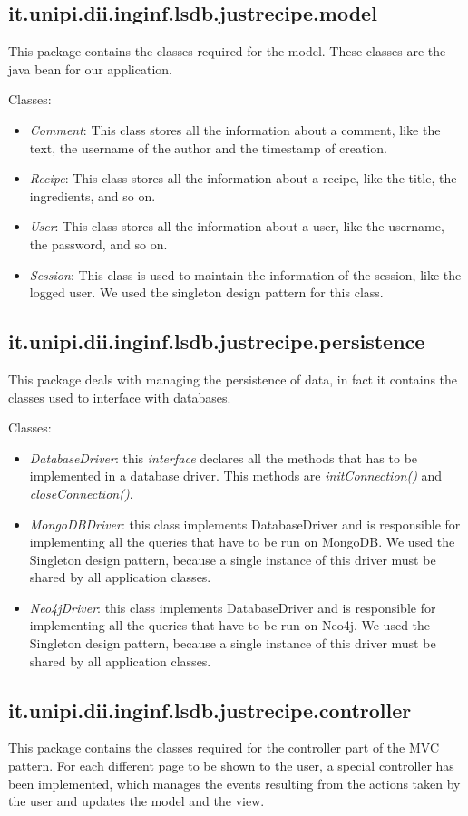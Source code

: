 \documentclass[a4paper]{report}
\begin{document}
\subsection{it.unipi.dii.inginf.lsdb.justrecipe.model}
This package contains the classes required for the model. These classes are the java bean for our application.

\noindent Classes:
  \begin{itemize}
	\item \emph{Comment}: This class stores all the information about a comment, like the text, the username of the author and the timestamp of creation. 
	\item \emph{Recipe}: This class stores all the information about a recipe, like the title, the ingredients, and so on.
	\item \emph{User}: This class stores all the information about a user, like the username, the password, and so on.
	\item \emph{Session}: This class is used to maintain the information of the session, like the logged user. We used the singleton design pattern for this class.
\end{itemize}
\subsection {it.unipi.dii.inginf.lsdb.justrecipe.persistence}
This package deals with managing the persistence of data, in fact it contains the classes used to interface with databases.

\noindent Classes:
 \begin{itemize}
	\item \emph{DatabaseDriver}: this \emph{interface} declares all the methods that has to be implemented in a database driver. This methods are \emph{initConnection()} and \emph{closeConnection()}.  
	\item \emph{MongoDBDriver}: this class implements DatabaseDriver and is responsible for implementing all the queries that have to be run on MongoDB. We used the Singleton design pattern, because a single instance of this driver must be shared by all application classes.
	\item \emph{Neo4jDriver}: this class implements DatabaseDriver and is responsible for implementing all the queries that have to be run on Neo4j. We used the Singleton design pattern, because a single instance of this driver must be shared by all application classes.
\end{itemize}
\subsection {it.unipi.dii.inginf.lsdb.justrecipe.controller}
This package contains the classes required for the controller part of the MVC pattern. For each different page to be shown to the user, a special controller has been implemented, which manages the events resulting from the actions taken by the user and updates the model and the view.
\end{document}
